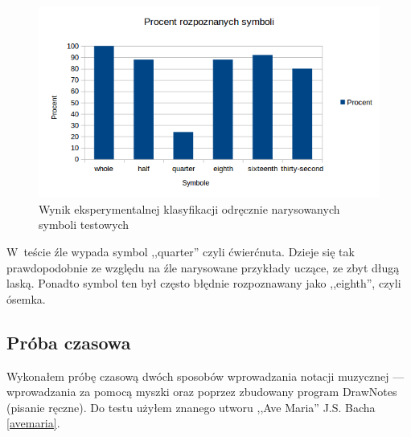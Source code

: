 \documentclass[polish,thesis,12pt]{dcsbook}
\begin{document}
\begin{figure}[H]
  \centering
  \includegraphics[scale=1.0,bb=0 0 605 340]{img/classify.png}
  \caption{Wynik eksperymentalnej klasyfikacji odręcznie narysowanych symboli testowych}
  \label{classify}
\end{figure}

W~teście źle wypada symbol ,,quarter'' czyli ćwierćnuta. Dzieje się tak prawdopodobnie ze względu na źle narysowane przykłady uczące, ze zbyt długą laską. Ponadto symbol ten był często błędnie rozpoznawany jako ,,eighth'', czyli ósemka.

\subsection{Próba czasowa}
Wykonałem próbę czasową dwóch sposobów wprowadzania notacji muzycznej --- wprowadzania za pomocą myszki oraz poprzez zbudowany program DrawNotes (pisanie ręczne). Do testu użyłem znanego utworu ,,Ave Maria'' J.S. Bacha \ref{avemaria}.
\end{document}
